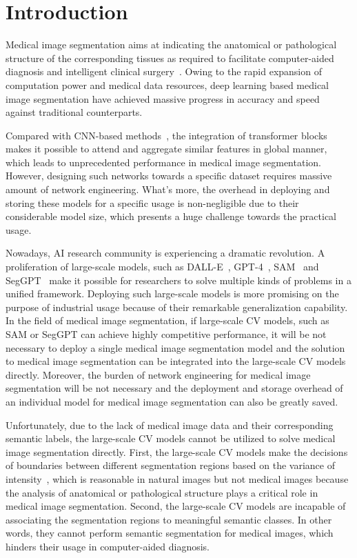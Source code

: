 \documentclass[runningheads]{llncs}
\begin{document}
\section{Introduction}
Medical image segmentation aims at indicating the anatomical or pathological structure of the corresponding tissues as required to facilitate computer-aided diagnosis and intelligent clinical surgery~\cite{lei2020medical}. Owing to the rapid expansion of computation power and medical data resources, deep learning based medical image segmentation have achieved massive progress in accuracy and speed against traditional counterparts.

Compared with CNN-based methods~\cite{ronneberger2015u,jin2020ra,schlemper2019attention}, the integration of transformer blocks~\cite{chen2021transunet,swinunet,10.1007/978-3-031-16919-9_9,azad2023daeformer} makes it possible to attend and aggregate similar features in global manner, which leads to unprecedented performance in medical image segmentation. However, designing such networks towards a specific dataset requires massive amount of network engineering. What's more, the overhead in deploying and storing these models for a specific usage is non-negligible due to their considerable model size, which presents a huge challenge towards the practical usage.

Nowadays, AI research community is experiencing a dramatic revolution. A proliferation of large-scale models, such as DALL-E~\cite{ramesh2021zero}, GPT-4~\cite{openai2023gpt4}, SAM~\cite{kirillov2023segment} and SegGPT~\cite{SegGPT} make it possible for researchers to solve multiple kinds of problems in a unified framework. Deploying such large-scale models is more promising on the purpose of industrial usage because of their remarkable generalization capability. In the field of medical image segmentation, if large-scale CV models, such as SAM or SegGPT can achieve highly competitive performance, it will be not necessary to deploy a single medical image segmentation model and the solution to medical image segmentation can be integrated into the large-scale CV models directly. Moreover, the burden of network engineering for medical image segmentation will be not necessary and the deployment and storage overhead of an individual model for medical image segmentation can also be greatly saved.

Unfortunately, due to the lack of medical image data and their corresponding semantic labels, the large-scale CV models cannot be utilized to solve medical image segmentation directly. First, the large-scale CV models make the decisions of boundaries between different segmentation regions based on the variance of intensity~\cite{ji2023sam,MedSAM}, which is reasonable in natural images but not medical images because the analysis of anatomical or pathological structure plays a critical role in medical image segmentation. Second, the large-scale CV models are incapable of associating the segmentation regions to meaningful semantic classes. In other words, they cannot perform semantic segmentation for medical images, which hinders their usage in computer-aided diagnosis.
\end{document}
